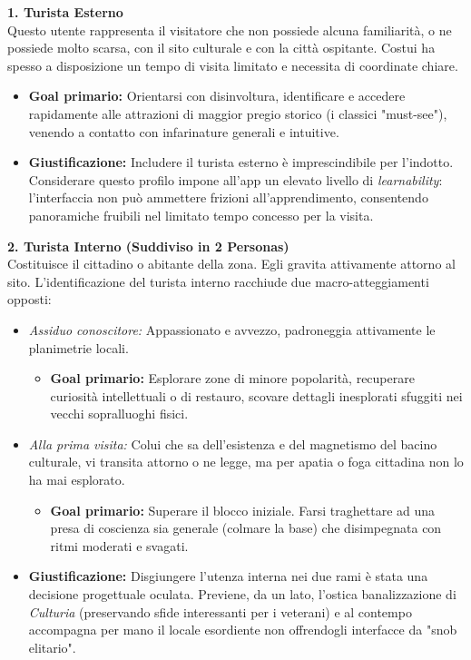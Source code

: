 \textcolor{culturiaRed}{\textbf{1. Turista Esterno}}\\
Questo utente rappresenta il visitatore che non possiede alcuna familiarità, o ne possiede molto scarsa, con il sito culturale e con la città ospitante. Costui ha spesso a disposizione un tempo di visita limitato e necessita di coordinate chiare.
\begin{itemize}
    \item \textbf{Goal primario:} Orientarsi con disinvoltura, identificare e accedere rapidamente alle attrazioni di maggior pregio storico (i classici "must-see"), venendo a contatto con infarinature generali e intuitive.
    \item \textbf{Giustificazione:} Includere il turista esterno è imprescindibile per l'indotto. Considerare questo profilo impone all'app un elevato livello di \textit{learnability}: l'interfaccia non può ammettere frizioni all'apprendimento, consentendo panoramiche fruibili nel limitato tempo concesso per la visita.
\end{itemize}

\textcolor{culturiaRed}{\textbf{2. Turista Interno (Suddiviso in 2 Personas)}}\\
Costituisce il cittadino o abitante della zona. Egli gravita attivamente attorno al sito. L'identificazione del turista interno racchiude due macro-atteggiamenti opposti:
\begin{itemize}
    \item \textit{Assiduo conoscitore:} Appassionato e avvezzo, padroneggia attivamente le planimetrie locali.
    \begin{itemize}
        \item \textbf{Goal primario:} Esplorare zone di minore popolarità, recuperare curiosità intellettuali o di restauro, scovare dettagli inesplorati sfuggiti nei vecchi sopralluoghi fisici.
    \end{itemize}
    \item \textit{Alla prima visita:} Colui che sa dell'esistenza e del magnetismo del bacino culturale, vi transita attorno o ne legge, ma per apatia o foga cittadina non lo ha mai esplorato.
    \begin{itemize}
        \item \textbf{Goal primario:} Superare il blocco iniziale. Farsi traghettare ad una presa di coscienza sia generale (colmare la base) che disimpegnata con ritmi moderati e svagati.
    \end{itemize}
    \item \textbf{Giustificazione:} Disgiungere l'utenza interna nei due rami è stata una decisione progettuale oculata. Previene, da un lato, l'ostica banalizzazione di \textit{Culturia} (preservando sfide interessanti per i veterani) e al contempo accompagna per mano il locale esordiente non offrendogli interfacce da "snob elitario".
\end{itemize}

